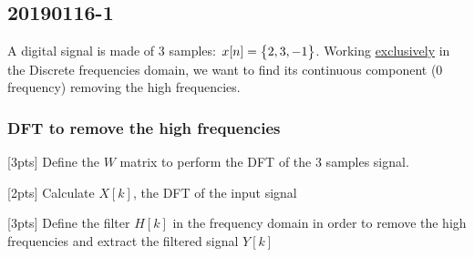 
\pagebreak\subsection{20190116-1}
    A digital signal is made of 3 samples: $x[n]=\begin{Bmatrix} {2,3,-1} \end{Bmatrix}$. Working \underline{exclusively} in the Discrete frequencies domain, we want to find its continuous component (0 frequency) removing the high frequencies.

    \subsubsection{DFT to remove the high frequencies}
    [3pts] Define the $W$ matrix to perform the DFT of the 3 samples signal.

    [2pts] Calculate $X[k]$, the DFT of the input signal

    [3pts] Define the filter $H[k]$ in the frequency domain in order to remove the high frequencies and extract the filtered signal $Y[k]$

